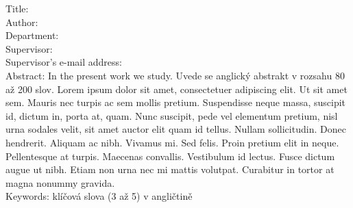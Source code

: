 \vfill %

\noindent
Title: \bcTitleEn\\
Author: \bcAuthor\\
Department: \bcKSVIen\\
Supervisor: \bcTeacher\\
Supervisor's e-mail address: \bcTeacherMail\\

\noindent Abstract: In the present work we study. Uvede se anglický abstrakt v rozsahu 80 až 200 slov. Lorem ipsum dolor sit amet, consectetuer adipiscing elit. Ut sit amet sem. Mauris nec turpis ac sem mollis pretium. Suspendisse neque massa, suscipit id, dictum in, porta at, quam. Nunc suscipit, pede vel elementum pretium, nisl urna sodales velit, sit amet auctor elit quam id tellus. Nullam sollicitudin. Donec hendrerit. Aliquam ac nibh. Vivamus mi. Sed felis. Proin pretium elit in neque. Pellentesque at turpis. Maecenas convallis. Vestibulum id lectus. Fusce dictum augue ut nibh. Etiam non urna nec mi mattis volutpat. Curabitur in tortor at magna nonummy gravida.\\

\noindent Keywords: klíčová slova (3 až 5) v angličtině

\vspace{10mm}

\cleardoublepage %
\endinput
